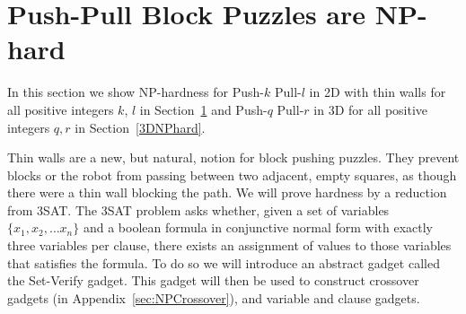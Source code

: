 
\section{Push-Pull Block Puzzles are NP-hard}
\label{2DNPhard}
In this section we show NP-hardness for Push-$k$ Pull-$l$ in 2D with thin walls for all positive integers $k$, $l$ in Section~\ref{2DNPhard} and Push-$q$ Pull-$r$ in 3D for all positive integers $q, r$ in Section~\ref{3DNPhard}. 

 


Thin walls are a new, but natural, notion for block pushing puzzles. They prevent blocks or the robot from passing between two adjacent, empty squares, as though there were a thin wall blocking the path. We will prove hardness by a reduction from 3SAT. The 3SAT problem asks whether, given a set of variables $\{x_1, x_2, \ldots x_n\}$ and a boolean formula in conjunctive normal form with exactly three variables per clause, there exists an assignment of values to those variables that satisfies the formula\cite{NPBook}. To do so we will introduce an abstract gadget called the Set-Verify gadget. This gadget will then be used to construct crossover gadgets (in Appendix~\ref{sec:NPCrossover}), and variable and clause gadgets.

